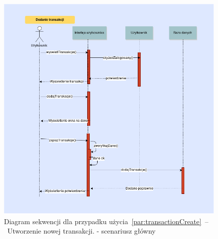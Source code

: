 \begin{figure}[H]
    \includegraphics[width=\textwidth,
    height=0.5\textheight]{images/dodanie_transakcji.png}
    \caption{Diagram sekwencji dla przypadku użycia~\ref{par:transactionCreate}~--~Utworzenie nowej transakcji.
    - scenariusz główny}
\end{figure}

